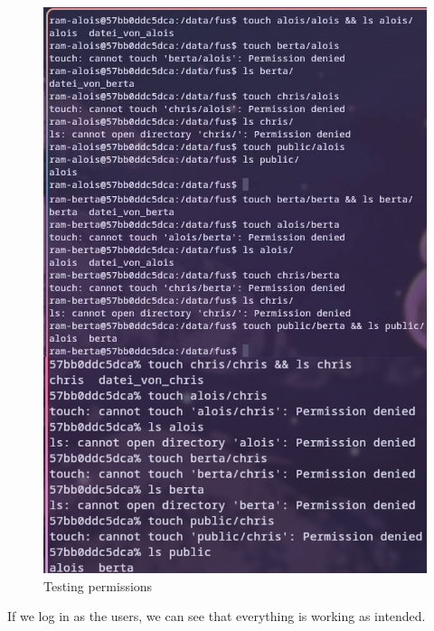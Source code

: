 \documentclass[a4paper]{article}
\newcommand{\abc}{\hfill \break}
\begin{document}
\begin{figure}[h]
	\centering
	\includegraphics[scale=1.2]{images/testing_perms.png}
	\caption{Testing permissions}
\end{figure} \abc
If we log in as the users, we can see that everything is working as intended.
\newpage
\end{document}
